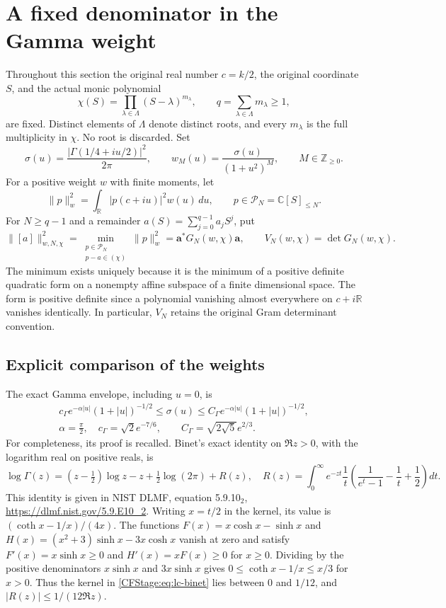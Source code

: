 \section{A fixed denominator in the Gamma weight}
\label{CFStage:sec:lc-fixed-denominator}

Throughout this section the original real number $c=k/2$, the original
coordinate $S$, and the actual monic polynomial
\[
 \chi(S)=\prod_{\lambda\in\Lambda}(S-\lambda)^{m_\lambda},
 \qquad q=\sum_{\lambda\in\Lambda}m_\lambda\ge1,
\]
are fixed. Distinct elements of $\Lambda$ denote distinct roots, and every
$m_\lambda$ is the full multiplicity in $\chi$. No root is discarded. Set
\[
 \sigma(u)=\frac{|\Gamma(1/4+iu/2)|^2}{2\pi},
 \qquad w_M(u)=\frac{\sigma(u)}{(1+u^2)^M},
 \qquad M\in\mathbb Z_{\ge0}.
 \tag{LC.1}\label{CFStage:eq:lc-weights}
\]
For a positive weight $w$ with finite moments, let
\[
 \|p\|_w^2=\int_{\mathbb R}|p(c+iu)|^2w(u)\,du,
 \qquad p\in\mathcal P_N=\mathbb C[S]_{\le N}.
 \tag{LC.2}\label{CFStage:eq:lc-norm}
\]
For $N\ge q-1$ and a remainder $a(S)=\sum_{j=0}^{q-1}a_jS^j$, put
\[
 \|[a]\|_{w,N,\chi}^2
 =\min_{\substack{p\in\mathcal P_N\\p-a\in(\chi)}}\|p\|_w^2
 =\boldsymbol a^*G_N(w,\chi)\boldsymbol a,
 \qquad V_N(w,\chi)=\det G_N(w,\chi).
 \tag{LC.3}\label{CFStage:eq:lc-quotient}
\]
The minimum exists uniquely because it is the minimum of a positive definite
quadratic form on a nonempty affine subspace of a finite dimensional space.
The form is positive definite since a polynomial vanishing almost everywhere
on $c+i\mathbb R$ vanishes identically. In particular, $V_N$ retains the
original Gram determinant convention.

\subsection{Explicit comparison of the weights}

The exact Gamma envelope, including $u=0$, is
\[
 \begin{gathered}
 c_\Gamma e^{-\alpha|u|}(1+|u|)^{-1/2}
 \le\sigma(u)\le
 C_\Gamma e^{-\alpha|u|}(1+|u|)^{-1/2},\\
 \alpha=\frac\pi2,
 \quad c_\Gamma=\sqrt2e^{-7/6},
 \qquad C_\Gamma=\sqrt{2\sqrt5}e^{2/3}.
 \end{gathered}
 \tag{LC.4}\label{CFStage:eq:lc-gamma-envelope}
\]
For completeness, its proof is recalled. Binet's exact identity on $\Re z>0$,
with the logarithm real on positive reals, is
\[
 \log\Gamma(z)=(z-\tfrac12)\log z-z+\tfrac12\log(2\pi)+R(z),
 \quad
 R(z)=\int_0^\infty e^{-zt}\frac1t
 \left(\frac1{e^t-1}-\frac1t+\frac12\right)dt.
 \tag{LC.5}\label{CFStage:eq:lc-binet}
\]
This identity is given in NIST DLMF, equation 5.9.10$_2$,
\url{https://dlmf.nist.gov/5.9.E10_2}.
Writing $x=t/2$ in the kernel, its value is
$(\coth x-1/x)/(4x)$. The functions
$F(x)=x\cosh x-\sinh x$ and
$H(x)=(x^2+3)\sinh x-3x\cosh x$ vanish at zero and satisfy
$F'(x)=x\sinh x\ge0$ and $H'(x)=xF(x)\ge0$ for $x\ge0$.
Dividing by the positive denominators $x\sinh x$ and $3x\sinh x$ gives
$0\le\coth x-1/x\le x/3$ for $x>0$. Thus the kernel in
\eqref{CFStage:eq:lc-binet} lies between $0$ and $1/12$, and
$|R(z)|\le1/(12\Re z)$.

